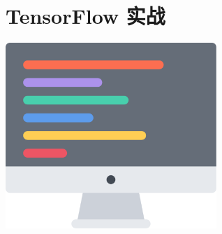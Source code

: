 
\section{TensorFlow 实战}
\begin{frame}{\secname}
\vfill\hspace{20pt}
\begin{minipage}[m]{0.25\textwidth}
  \linespread{1}\large
  \tableofcontents[sectionstyle = hide/hide, subsectionstyle = show/show/hide]
\end{minipage}%
\hfill%
\begin{minipage}[m]{0.6\textwidth}
  \includegraphics[height = 7cm]{./icons/programming.pdf}
\end{minipage}%
\vfill
\end{frame}

